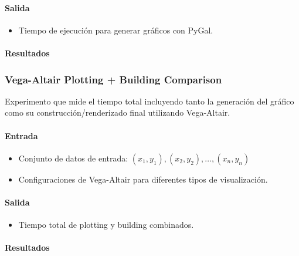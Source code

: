 \paragraph{Salida}
\begin{itemize}
    \item Tiempo de ejecución para generar gráficos con PyGal.
\end{itemize}

\paragraph{Resultados}
\vspace{0.5em}
\noindent

\PyGalPlotTime
\newpage

\subsubsection{Vega-Altair Plotting + Building Comparison}
\label{vega_altair_plot_plus_build_time}

Experimento que mide el tiempo total incluyendo tanto la generación del gráfico como su construcción/renderizado final utilizando Vega-Altair.

\paragraph{Entrada}
\begin{itemize}
    \item Conjunto de datos de entrada: \( (x_1, y_1), (x_2, y_2), \ldots, (x_n, y_n) \)
    \item Configuraciones de Vega-Altair para diferentes tipos de visualización.
\end{itemize}

\paragraph{Salida}
\begin{itemize}
    \item Tiempo total de plotting y building combinados.
\end{itemize}

\paragraph{Resultados}
\vspace{0.5em}
\noindent

\VegaAltairPlottingBuildingComparison
\newpage

